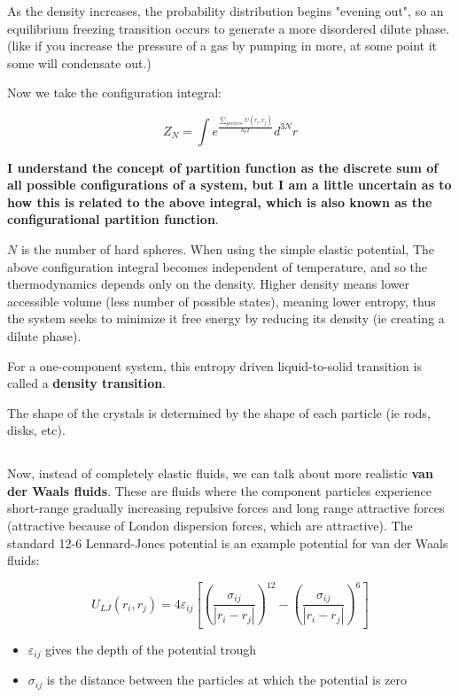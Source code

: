 \documentclass{article}
\begin{document}
As the density increases, the probability distribution begins "evening out", so an equilibrium freezing transition occurs to generate a more disordered dilute phase. (like if you increase the pressure of a gas by pumping in more, at some point it some will condensate out.)

Now we take the configuration integral:

\[Z_N=\int e^{\frac{\sum_{pairwise} U(r_i,r_j)}{k_bT}}d^{3N}r\]

\textbf{I understand the concept of partition function as the discrete sum of all possible configurations of a system, but I am a little uncertain as to how this is related to the above integral, which is also known as the configurational partition function}.

$N$ is the number of hard spheres. When using the simple elastic potential, The above configuration integral becomes independent of temperature, and so the thermodynamics depends only on the density. Higher density means lower accessible volume (less number of possible states), meaning lower entropy, thus the system seeks to minimize it free energy by reducing its density (ie creating a dilute phase).

For a one-component system, this entropy driven liquid-to-solid transition is called a \textbf{density transition}.

The shape of the crystals is determined by the shape of each particle (ie rods, disks, etc).

\subsection{}

Now, instead of completely elastic fluids, we can talk about more realistic \textbf{van der Waals fluids}. These are fluids where the component particles experience short-range gradually increasing repulsive forces and long range attractive forces (attractive because of London dispersion forces, which are attractive). The standard 12-6 Lennard-Jones potential is an example potential for van der Waals fluids:

\[U_{LJ}(r_i,r_j)=4\varepsilon_{ij}[(\frac{\sigma_{ij}}{|r_i-r_j|})^{12} - (\frac{\sigma_{ij}}{|r_i-r_j|})^6]\]

\begin{itemize}
    \item $\varepsilon_{ij}$ gives the depth of the potential trough
    \item $\sigma_{ij}$ is the distance between the particles at which the potential is zero
\end{itemize}
\end{document}
